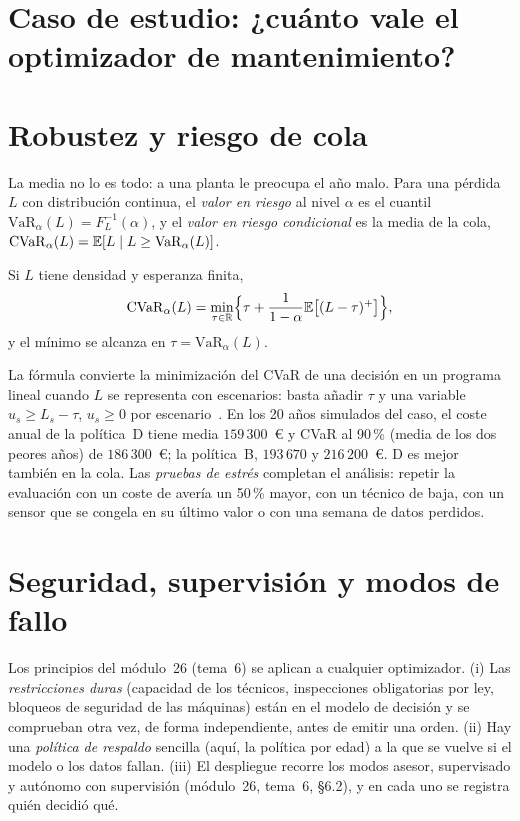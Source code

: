 \section{Caso de estudio: ¿cuánto vale el optimizador de mantenimiento?}

\addtocounter{definicion}{1}%

\section{Robustez y riesgo de cola}

La media no lo es todo: a una planta le preocupa el año malo. Para una pérdida $L$ con distribución continua, el \emph{valor en riesgo} al nivel $\alpha$ es el cuantil $\mathrm{VaR}_\alpha(L)=F_L^{-1}(\alpha)$, y el \emph{valor en riesgo condicional} es la media de la cola, $\mathrm{CVaR}_\alpha(L)=\mathbb{E}[L\mid L\ge\mathrm{VaR}_\alpha(L)]$.

\begin{proposicion}\label{prop:cvar}
Si $L$ tiene densidad y esperanza finita,
\[
\mathrm{CVaR}_\alpha(L)=\min_{\tau\in\mathbb{R}}\Bigl\{\tau+\frac{1}{1-\alpha}\mathbb{E}\bigl[(L-\tau)^{+}\bigr]\Bigr\},
\]
y el mínimo se alcanza en $\tau=\mathrm{VaR}_\alpha(L)$.
\end{proposicion}

La fórmula convierte la minimización del CVaR de una decisión en un programa lineal cuando $L$ se representa con escenarios: basta añadir $\tau$ y una variable $u_s\ge L_s-\tau$, $u_s\ge0$ por escenario~\cite{ru}. En los 20 años simulados del caso, el coste anual de la política~D tiene media $159\,300$~€ y CVaR al 90\,\% (media de los dos peores años) de $186\,300$~€; la política~B, $193\,670$ y $216\,200$~€. D es mejor también en la cola. Las \emph{pruebas de estrés} completan el análisis: repetir la evaluación con un coste de avería un 50\,\% mayor, con un técnico de baja, con un sensor que se congela en su último valor o con una semana de datos perdidos.

\section{Seguridad, supervisión y modos de fallo}

Los principios del módulo~26 (tema~6) se aplican a cualquier optimizador. (i) Las \emph{restricciones duras} (capacidad de los técnicos, inspecciones obligatorias por ley, bloqueos de seguridad de las máquinas) están en el modelo de decisión y se comprueban otra vez, de forma independiente, antes de emitir una orden. (ii) Hay una \emph{política de respaldo} sencilla (aquí, la política por edad) a la que se vuelve si el modelo o los datos fallan. (iii) El despliegue recorre los modos asesor, supervisado y autónomo con supervisión (módulo~26, tema~6, §6.2), y en cada uno se registra quién decidió qué.


